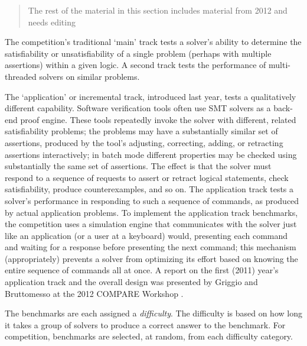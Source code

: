 \documentclass[twosize,11pt]{article}
\newcommand{\comment}[2]{\begin{quote}\sc #1\marginpar{\textcolor{red}{$\ast^{\mbox{#2}}$}}\end{quote}}
\newcommand{\davidc}[1]{\comment{#1}{DC}}
\begin{document}
\davidc{The rest of the material in this section includes material from 2012 and needs editing}

The competition's traditional `main' track tests a solver's ability to determine the satisfiability or unsatisfiability of a single problem (perhaps with multiple assertions) within a given logic. A second track tests the performance of multi-threaded solvers on similar problems.

The `application' or incremental track, introduced last year, tests a qualitatively different capability. Software verification tools often use SMT solvers as a back-end proof engine. These tools repeatedly invoke the solver with different, related satisfiability problems; the problems may have a substantially similar set of assertions, produced by the tool's adjusting, correcting, adding, or retracting assertions interactively; in batch mode different properties may be checked using substantially the same set of assertions.
The effect is that the solver must respond to a sequence of requests to assert or retract logical statements, check satisfiability, produce counterexamples, and so on. The application track tests a solver's performance in responding to such a sequence of commands, as produced by actual application problems. To implement the application track benchmarks, the 
competition uses a simulation engine that communicates with the solver just like an application (or a user at a keyboard) would, presenting each command and waiting for a response before presenting the next command; this mechanism (appropriately) prevents a solver from optimizing its effort based on knowing the entire sequence of commands all at once. A report
on the first (2011) year's application track and the overall design was presented by Griggio and Bruttomesso at the 
2012 COMPARE Workshop \cite{ag+rb+12}.

The benchmarks are each assigned a {\em difficulty}. The difficulty is based on how long it takes a group of solvers to produce a correct answer to the benchmark. For competition, benchmarks are selected, at random, from each difficulty category. 
\end{document}
